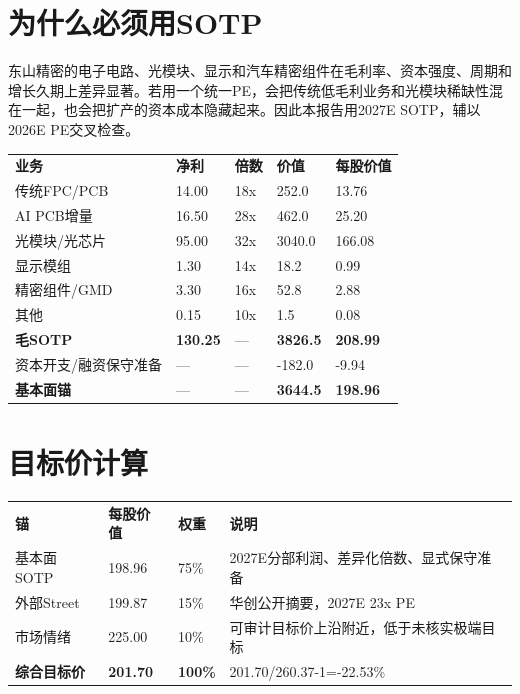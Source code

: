 
\section{为什么必须用SOTP}
东山精密的电子电路、光模块、显示和汽车精密组件在毛利率、资本强度、周期和增长久期上差异显著。若用一个统一PE，会把传统低毛利业务和光模块稀缺性混在一起，也会把扩产的资本成本隐藏起来。因此本报告用2027E SOTP，辅以2026E PE交叉检查。

\begin{exhibitbox}
\begin{tabularx}{\exhibitboxwidth}{L{3.0cm}R{1.8cm}R{1.8cm}R{2.0cm}R{2.0cm}}
\textbf{业务} & \textbf{净利} & \textbf{倍数} & \textbf{价值} & \textbf{每股价值} \\
传统FPC/PCB & 14.00 & 18x & 252.0 & 13.76 \\
AI PCB增量 & 16.50 & 28x & 462.0 & 25.20 \\
光模块/光芯片 & 95.00 & 32x & 3040.0 & 166.08 \\
显示模组 & 1.30 & 14x & 18.2 & 0.99 \\
精密组件/GMD & 3.30 & 16x & 52.8 & 2.88 \\
其他 & 0.15 & 10x & 1.5 & 0.08 \\
\textbf{毛SOTP} & \textbf{130.25} & — & \textbf{3826.5} & \textbf{208.99} \\
资本开支/融资保守准备 & — & — & -182.0 & -9.94 \\
\textbf{基本面锚} & — & — & \textbf{3644.5} & \textbf{198.96} \\
\end{tabularx}
\end{exhibitbox}

\section{目标价计算}
\begin{exhibitbox}
\begin{tabularx}{\exhibitboxwidth}{L{3.3cm}R{2.2cm}R{2.0cm}X}
\textbf{锚} & \textbf{每股价值} & \textbf{权重} & \textbf{说明} \\
基本面SOTP & 198.96 & 75\% & 2027E分部利润、差异化倍数、显式保守准备 \\
外部Street & 199.87 & 15\% & 华创公开摘要，2027E 23x PE \\
市场情绪 & 225.00 & 10\% & 可审计目标价上沿附近，低于未核实极端目标 \\
\textbf{综合目标价} & \textbf{201.70} & \textbf{100\%} & 201.70/260.37-1=-22.53\% \\
\end{tabularx}
\end{exhibitbox}

